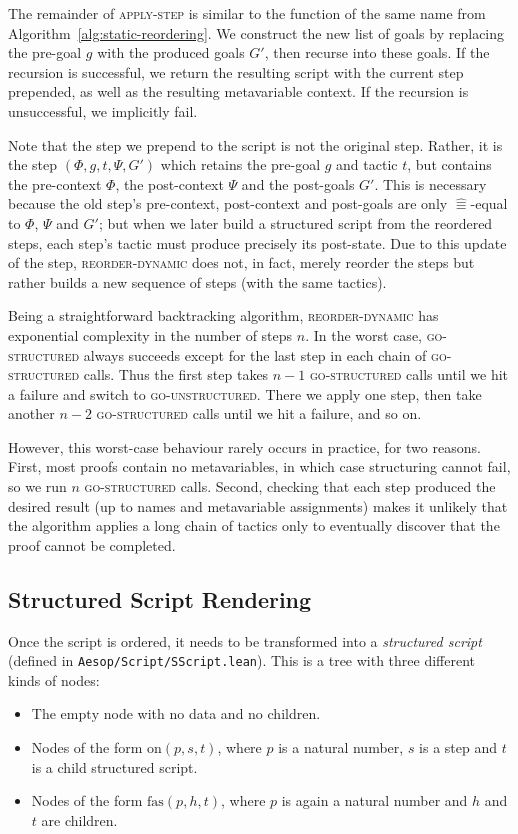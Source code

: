 \documentclass[sigplan,10pt,anonymous,review]{acmart}
\newcommand{\step}[5]{\ensuremath{(#1,\allowbreak #2,\allowbreak #3,\allowbreak #4,\allowbreak #5)}}
\newcommand{\aeq}{\mathrel{\hat{≡}}}
\begin{document}
The remainder of \textsc{apply-step} is similar to the function of the same name from Algorithm~\ref{alg:static-reordering}.
We construct the new list of goals by replacing the pre-goal $g$ with the produced goals $G'$, then recurse into these goals.
If the recursion is successful, we return the resulting script with the current step prepended, as well as the resulting metavariable context.
If the recursion is unsuccessful, we implicitly fail.

Note that the step we prepend to the script is not the original step.
Rather, it is the step $\step{Φ}{g}{t}{Ψ}{G'}$ which retains the pre-goal $g$ and tactic $t$, but contains the pre-context $Φ$, the post-context $Ψ$ and the post-goals $G'$.
This is necessary because the old step's pre-context, post-context and post-goals are only $\aeq$-equal to $Φ$, $Ψ$ and $G'$; but when we later build a structured script from the reordered steps, each step's tactic must produce precisely its post-state.
Due to this update of the step, \textsc{reorder-dynamic} does not, in fact, merely reorder the steps but rather builds a new sequence of steps (with the same tactics).

Being a straightforward backtracking algorithm, \textsc{reorder-dynamic} has exponential complexity in the number of steps $n$.
In the worst case, \textsc{go-structured} always succeeds except for the last step in each chain of \textsc{go-structured} calls.
Thus the first step takes $n-1$ \textsc{go-structured} calls until we hit a failure and switch to \textsc{go-unstructured}.
There we apply one step, then take another $n-2$ \textsc{go-structured} calls until we hit a failure, and so on.

However, this worst-case behaviour rarely occurs in practice, for two reasons.
First, most proofs contain no metavariables, in which case structuring cannot fail, so we run $n$ \textsc{go-structured} calls.
Second, checking that each step produced the desired result (up to names and metavariable assignments) makes it unlikely that the algorithm applies a long chain of tactics only to eventually discover that the proof cannot be completed.

\subsection{Structured Script Rendering}%
\label{sec:rendering}

Once the script is ordered, it needs to be transformed into a \emph{structured script} (defined in \texttt{Aesop/Script/SScript.lean}).
This is a tree with three different kinds of nodes:
\begin{itemize}
  \item The $\mathrm{empty}$ node with no data and no children.
  \item Nodes of the form $\mathrm{on}(p, s, t)$, where $p$ is a natural number, $s$ is a step and $t$ is a child structured script.
  \item Nodes of the form $\mathrm{fas}(p, h, t)$, where $p$ is again a natural number and $h$ and $t$ are children.
\end{itemize}
\end{document}
